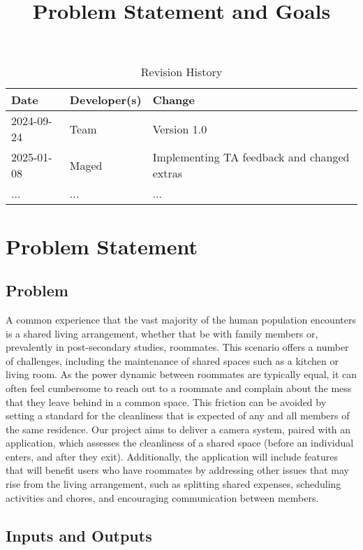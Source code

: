 \documentclass{article}
\title{Problem Statement and Goals\\\progname}
\author{\authname}
\date{}
\begin{document}
\maketitle

\begin{table}[hp]
\caption{Revision History} \label{TblRevisionHistory}
\begin{tabularx}{\textwidth}{llX}
\toprule
\textbf{Date} & \textbf{Developer(s)} & \textbf{Change}\\
\midrule
2024-09-24 & Team & Version 1.0 \\
2025-01-08 & Maged & Implementing TA feedback and changed extras\\
... & ... & ...\\
\bottomrule
\end{tabularx}
\end{table}

\section{Problem Statement}
\subsection{Problem}
A common experience that the vast majority of the human population encounters is a
shared living arrangement, whether that be with family members or, prevalently in
post-secondary studies, roommates. This scenario offers a number of challenges, including the
maintenance of shared spaces such as a kitchen or living room. As the power dynamic between
roommates are typically equal, it can often feel cumbersome to reach out to a roommate and
complain about the mess that they leave behind in a common space. This friction can be
avoided by setting a standard for the cleanliness that is expected of any and all members of the
same residence. Our project aims to deliver a camera system, paired with an application, which
assesses the cleanliness of a shared space (before an individual enters, and after they exit).
Additionally, the application will include features that will benefit users who have roommates by
addressing other issues that may rise from the living arrangement, such as splitting shared
expenses, scheduling activities and chores, and encouraging communication between
members.

\subsection{Inputs and Outputs}
\end{document}
